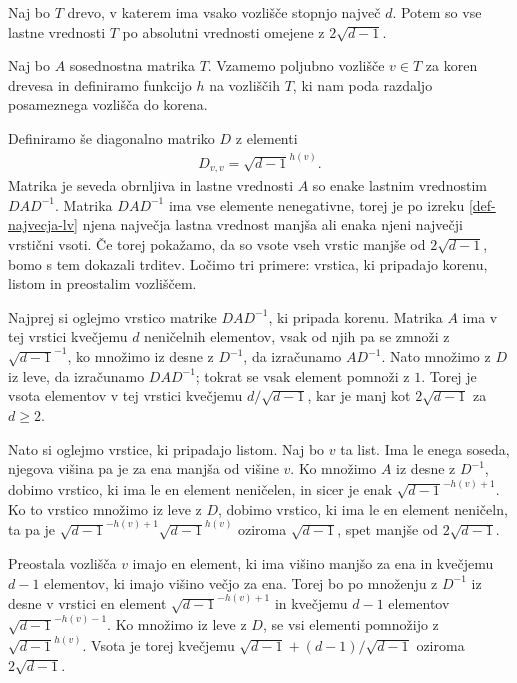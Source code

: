 \begin{izrek}\label{lastne-vrednosti-drevesa}
    Naj bo \(T\) drevo, v katerem ima vsako vozlišče stopnjo največ \(d\). Potem so vse lastne vrednosti \(T\) po absolutni vrednosti omejene z \(2\sqrt{d-1}\).
\end{izrek}
\begin{dokaz}
    Naj bo \(A\) sosednostna matrika \(T\). Vzamemo poljubno vozlišče \(v\in T\) za koren drevesa in definiramo funkcijo \(h\) na vozliščih \(T\), ki nam poda razdaljo posameznega vozlišča do korena.

    Definiramo še diagonalno matriko \(D\) z elementi
    \begin{align*}
        D_{v, v} = \sqrt{d-1}^{h(v)}.
    \end{align*}
    Matrika je seveda obrnljiva in lastne vrednosti \(A\) so enake lastnim vrednostim \(D A D^{-1}\). Matrika \(DAD^{-1}\) ima vse elemente nenegativne, torej je po izreku \ref{def-najvecja-lv} njena največja lastna vrednost manjša ali enaka njeni največji vrstični vsoti. Če torej pokažamo, da so vsote vseh vrstic manjše od \(2\sqrt{d-1}\), bomo s tem dokazali trditev. Ločimo tri primere: vrstica, ki pripadajo korenu, listom in preostalim vozliščem.

    Najprej si oglejmo vrstico matrike \(DAD^{-1}\), ki pripada korenu. Matrika \(A\) ima v tej vrstici kvečjemu \(d\) neničelnih elementov, vsak od njih pa se zmnoži z \(\sqrt{d-1}^{-1}\), ko množimo iz desne z \(D^{-1}\), da izračunamo \(AD^{-1}\). Nato množimo z \(D\) iz leve, da izračunamo \(DAD^{-1}\); tokrat se vsak element pomnoži z \(1\). Torej je vsota elementov v tej vrstici kvečjemu \(d/\sqrt{d-1}\), kar je manj kot \(2\sqrt{d-1}\) za \(d\geq 2\).

    Nato si oglejmo vrstice, ki pripadajo listom. Naj bo \(v\) ta list. Ima le enega soseda, njegova višina pa je za ena manjša od višine \(v\). Ko množimo \(A\) iz desne z \(D^{-1}\), dobimo vrstico, ki ima le en element neničelen, in sicer je enak \(\sqrt{d-1}^{-h(v)+1}\). Ko to vrstico množimo iz leve z \(D\), dobimo vrstico, ki ima le en element neničeln, ta pa je \(\sqrt{d-1}^{-h(v)+1}\sqrt{d-1}^{h(v)}\) oziroma \(\sqrt{d-1}\), spet manjše od \(2\sqrt{d-1}\).

    Preostala vozlišča \(v\) imajo en element, ki ima višino manjšo za ena in kvečjemu \(d-1\) elementov, ki imajo višino večjo za ena. Torej bo po množenju z \(D^{-1}\) iz desne v vrstici en element \(\sqrt{d-1}^{-h(v)+1}\) in kvečjemu \(d-1\) elementov \(\sqrt{d-1}^{-h(v)-1}\). Ko množimo iz leve z \(D\), se vsi elementi pomnožijo z \(\sqrt{d-1}^{h(v)}\). Vsota je torej kvečjemu \(\sqrt{d-1} + (d-1)/\sqrt{d-1}\) oziroma \(2\sqrt{d-1}\).
\end{dokaz}

